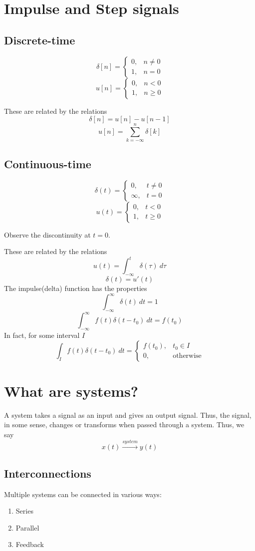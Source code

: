 \documentclass[10pt, a4paper]{extarticle}
\theoremstyle{definition}
\begin{document}
\section{Impulse and Step signals}
\subsection{Discrete-time}
\[\delta[n]= \begin{cases}
		0, & n\neq 0 \\
		1, & n= 0
	\end{cases}\]
\[u[n]= \begin{cases}
		0, & n< 0    \\
		1, & n\geq 0
	\end{cases}\]

These are related by the relations
\[\delta[n]=u[n]-u[n-1]\]
\[u[n]=\sum_{k=-\infty}^n\delta[k]\]


\subsection{Continuous-time}
\[\delta(t)= \begin{cases}
		0,      & t\neq 0 \\
		\infty, & t= 0
	\end{cases}\]
\[u(t)= \begin{cases}
		0, & t< 0    \\
		1, & t\geq 0
	\end{cases}\]

Observe the discontinuity at $t=0$.

These are related by the relations
\[u(t)=\int_{-\infty}^{t}\delta(\tau)\ d\tau\]
\[\delta(t)=u'(t)\]
The impulse(delta) function has the properties
\[\int_{-\infty}^{\infty}\delta(t)\ dt=1\]
\[\int_{-\infty}^{\infty}f(t)\delta(t-t_0)\ dt=f(t_0)\]
In fact, for some interval $I$
\[\int_{I}f(t)\delta(t-t_0)\ dt=\begin{cases}
		f(t_0), & t_0\in I         \\
		0,      & \text{otherwise}
	\end{cases}\]

\section{What are systems?}
A system takes a signal as an input and gives an output signal. Thus, the signal, in some sense, changes or transforms when passed through a system.
Thus, we say
\[x(t)\xrightarrow{system}y(t)\]
\subsection{Interconnections}
Multiple systems can be connected in various ways:
\begin{enumerate}
	\item Series
	\item Parallel
	\item Feedback
\end{enumerate}
\end{document}
